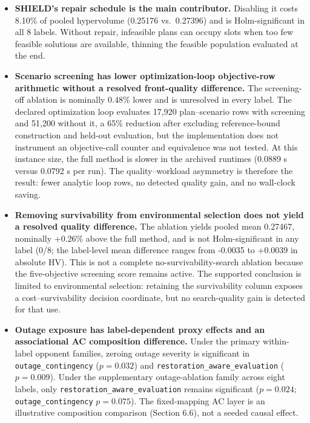 \documentclass[energies,article,submit,moreauthors]{Definitions/mdpi}
\begin{document}
\begin{itemize}
\item
  \textbf{SHIELD's repair schedule is the main contributor.} Disabling it costs 8.10\% of pooled hypervolume (0.25176 vs.~0.27396) and is Holm-significant in all 8 labels. Without repair, infeasible plans can occupy slots when too few feasible solutions are available, thinning the feasible population evaluated at the end.
\item
  \textbf{Scenario screening has lower optimization-loop objective-row arithmetic without a resolved front-quality difference.} The screening-off ablation is nominally 0.48\% lower and is unresolved in every label. The declared optimization loop evaluates 17,920 plan--scenario rows with screening and 51,200 without it, a 65\% reduction after excluding reference-bound construction and held-out evaluation, but the implementation does not instrument an objective-call counter and equivalence was not tested. At this instance size, the full method is slower in the archived runtimes (0.0889 s versus 0.0792 s per run). The quality--workload asymmetry is therefore the result: fewer analytic loop rows, no detected quality gain, and no wall-clock saving.
\item
  \textbf{Removing survivability from environmental selection does not yield a resolved quality difference.} The ablation yields pooled mean 0.27467, nominally +0.26\% above the full method, and is not Holm-significant in any label (0/8; the label-level mean difference ranges from -0.0035 to +0.0039 in absolute HV). This is not a complete no-survivability-search ablation because the five-objective screening score remains active. The supported conclusion is limited to environmental selection: retaining the survivability column exposes a cost--survivability decision coordinate, but no search-quality gain is detected for that use.
\item
  \textbf{Outage exposure has label-dependent proxy effects and an associational AC composition difference.} Under the primary within-label opponent families, zeroing outage severity is significant in \texttt{outage\_contingency} (\(p=0.032\)) and \texttt{restoration\_aware\_evaluation} (\(p=0.009\)). Under the supplementary outage-ablation family across eight labels, only \texttt{restoration\_aware\_evaluation} remains significant (\(p=0.024\); \texttt{outage\_contingency} \(p=0.075\)). The fixed-mapping AC layer is an illustrative composition comparison (Section 6.6), not a seeded causal effect.
\end{itemize}
\end{document}

